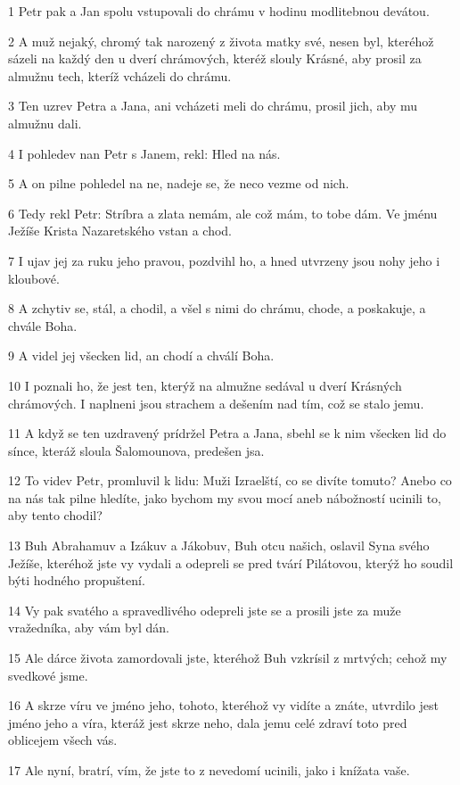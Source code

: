 \par 1 Petr pak a Jan spolu vstupovali do chrámu v hodinu modlitebnou devátou.
\par 2 A muž nejaký, chromý tak narozený z života matky své, nesen byl, kteréhož sázeli na každý den u dverí chrámových, kteréž slouly Krásné, aby prosil za almužnu tech, kteríž vcházeli do chrámu.
\par 3 Ten uzrev Petra a Jana, ani vcházeti meli do chrámu, prosil jich, aby mu almužnu dali.
\par 4 I pohledev nan Petr s Janem, rekl: Hled na nás.
\par 5 A on pilne pohledel na ne, nadeje se, že neco vezme od nich.
\par 6 Tedy rekl Petr: Stríbra a zlata nemám, ale což mám, to tobe dám. Ve jménu Ježíše Krista Nazaretského vstan a chod.
\par 7 I ujav jej za ruku jeho pravou, pozdvihl ho, a hned utvrzeny jsou nohy jeho i kloubové.
\par 8 A zchytiv se, stál, a chodil, a všel s nimi do chrámu, chode, a poskakuje, a chvále Boha.
\par 9 A videl jej všecken lid, an chodí a chválí Boha.
\par 10 I poznali ho, že jest ten, kterýž na almužne sedával u dverí Krásných chrámových. I naplneni jsou strachem a dešením nad tím, což se stalo jemu.
\par 11 A když se ten uzdravený prídržel Petra a Jana, sbehl se k nim všecken lid do sínce, kteráž sloula Šalomounova, predešen jsa.
\par 12 To videv Petr, promluvil k lidu: Muži Izraelští, co se divíte tomuto? Anebo co na nás tak pilne hledíte, jako bychom my svou mocí aneb nábožností ucinili to, aby tento chodil?
\par 13 Buh Abrahamuv a Izákuv a Jákobuv, Buh otcu našich, oslavil Syna svého Ježíše, kteréhož jste vy vydali a odepreli se pred tvárí Pilátovou, kterýž ho soudil býti hodného propuštení.
\par 14 Vy pak svatého a spravedlivého odepreli jste se a prosili jste za muže vražedníka, aby vám byl dán.
\par 15 Ale dárce života zamordovali jste, kteréhož Buh vzkrísil z mrtvých; cehož my svedkové jsme.
\par 16 A skrze víru ve jméno jeho, tohoto, kteréhož vy vidíte a znáte, utvrdilo jest jméno jeho a víra, kteráž jest skrze neho, dala jemu celé zdraví toto pred oblicejem všech vás.
\par 17 Ale nyní, bratrí, vím, že jste to z nevedomí ucinili, jako i knížata vaše.
